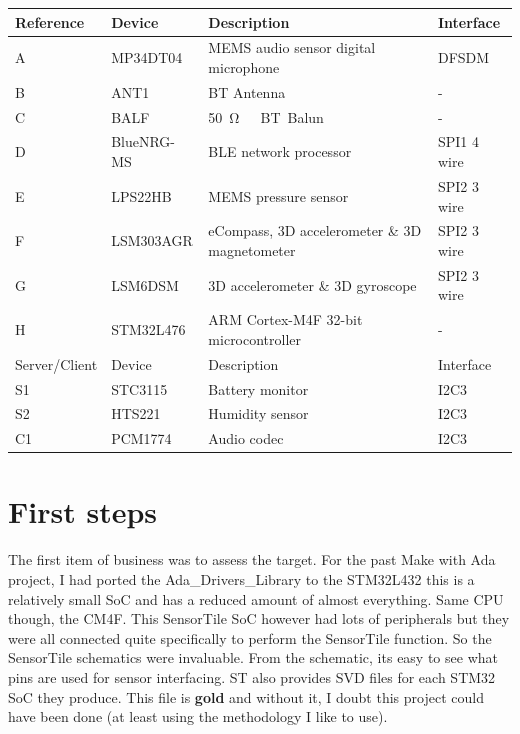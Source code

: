 \documentclass[11pt]{article}
\numberwithin{figure}{section}
\begin{document}
\begin{table}[h]
\begin{tabular}{|l|l|l|l|}
\hline
Reference   & Device   & Description & Interface\\ \hline
A & MP34DT04 & MEMS audio sensor digital microphone & DFSDM \\ \hline
B & ANT1 & BT Antenna & -\\ \hline
C & BALF & \SI{50}\ohm \ BT Balun & - \\ \hline
D & BlueNRG-MS & BLE network processor & SPI1 4 wire \\ \hline
E & LPS22HB & MEMS pressure sensor & SPI2 3 wire\\ \hline
F & LSM303AGR & eCompass, 3D accelerometer \& 3D magnetometer & SPI2
3 wire \\ \hline
G & LSM6DSM & 3D accelerometer \& 3D gyroscope & SPI2
3 wire \\ \hline
H & STM32L476 & ARM Cortex-M4F 32-bit microcontroller & -  \\ \hline
Server/Client   & Device   & Description & Interface\\ \hline
S1 & STC3115 & Battery monitor & I2C3\\ \hline
S2 & HTS221 & Humidity sensor & I2C3\\ \hline
C1 & PCM1774 & Audio codec & I2C3\\ \hline
\end{tabular}

\end{table}
\FloatBarrier
%
\section{First steps}
The first item of business was to assess the target. For the past Make
with Ada project, I had ported the Ada\_Drivers\_Library to the
STM32L432 this is a relatively small SoC and has a reduced amount of
almost everything. Same CPU though, the CM4F. This SensorTile SoC
however had lots of peripherals but they were all connected quite
specifically to perform the SensorTile function. So the SensorTile
schematics were invaluable. From the schematic, its easy to see what
pins are used for sensor interfacing. ST also provides SVD files for
each STM32 SoC they produce. This file is
\textcolor[rgb]{1.0,0.84,0.0}{\textbf{gold}} and without it, I doubt this
project could have been done (at least using the methodology I like to use).
\end{document}
